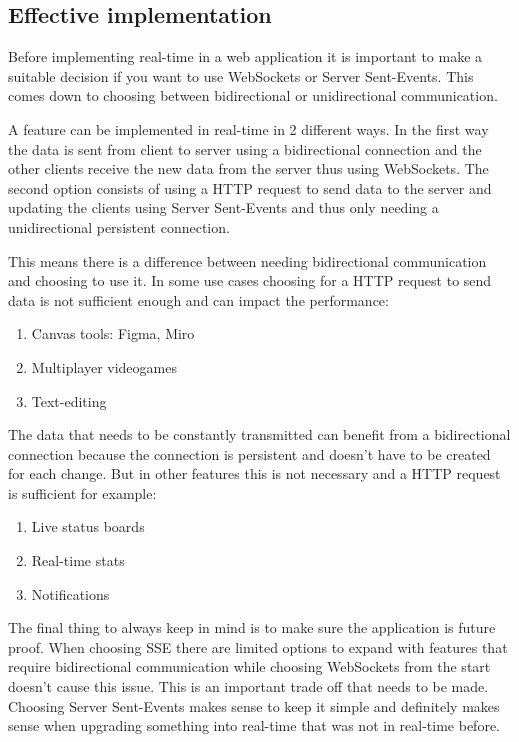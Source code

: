\newpage

\subsection{Effective implementation}

Before implementing real-time in a web application it is important to make a suitable decision if you want to use WebSockets or Server Sent-Events. This comes down to choosing between bidirectional or unidirectional communication.

A feature can be implemented in real-time in 2 different ways. In the first way the data is sent from client to server using a bidirectional connection and the other clients receive the new data from the server thus using WebSockets. The second option consists of using a HTTP request to send data to the server and updating the clients using Server Sent-Events and thus only needing a unidirectional persistent connection.

This means there is a difference between needing bidirectional communication and choosing to use it. In some use cases choosing for a HTTP request to send data is not sufficient enough and can impact the performance:

\begin{enumerate}
  \item Canvas tools: Figma, Miro
  \item Multiplayer videogames
  \item Text-editing
\end{enumerate}

The data that needs to be constantly transmitted can benefit from a bidirectional connection because the connection is persistent and doesn't have to be created for each change. But in other features this is not necessary and a HTTP request is sufficient for example:

\begin{enumerate}
  \item Live status boards
  \item Real-time stats
  \item Notifications
\end{enumerate}

The final thing to always keep in mind is to make sure the application is future proof. When choosing SSE there are limited options to expand with features that require bidirectional communication while choosing WebSockets from the start doesn't cause this issue. This is an important trade off that needs to be made. Choosing Server Sent-Events makes sense to keep it simple and definitely makes sense when upgrading something into real-time that was not in real-time before.

